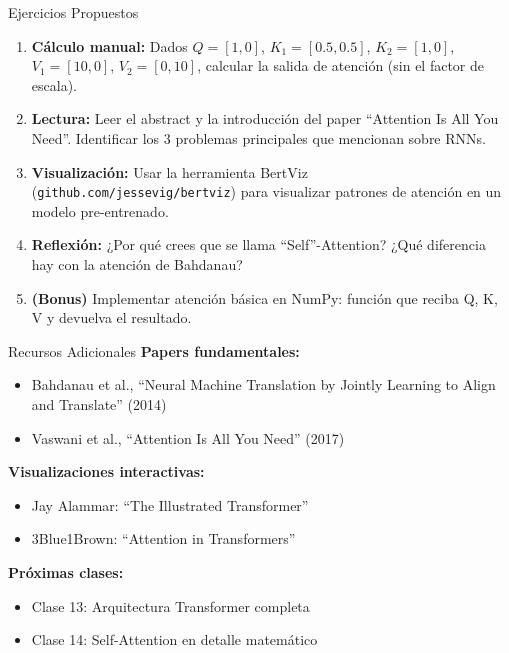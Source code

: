 \documentclass[aspectratio=169]{beamer}
\begin{document}
\begin{frame}{Ejercicios Propuestos}
    \begin{enumerate}
        \setlength\itemsep{0.6em}
        \item \textbf{Cálculo manual:} Dados $Q=[1,0]$, $K_1=[0.5, 0.5]$, $K_2=[1, 0]$, $V_1=[10, 0]$, $V_2=[0, 10]$, calcular la salida de atención (sin el factor de escala).
        
        \item \textbf{Lectura:} Leer el abstract y la introducción del paper ``Attention Is All You Need''. Identificar los 3 problemas principales que mencionan sobre RNNs.
        
        \item \textbf{Visualización:} Usar la herramienta BertViz (\texttt{github.com/jessevig/bertviz}) para visualizar patrones de atención en un modelo pre-entrenado.
        
        \item \textbf{Reflexión:} ¿Por qué crees que se llama ``Self''-Attention? ¿Qué diferencia hay con la atención de Bahdanau?
        
        \item \textbf{(Bonus)} Implementar atención básica en NumPy: función que reciba Q, K, V y devuelva el resultado.
    \end{enumerate}
\end{frame}

\begin{frame}{Recursos Adicionales}
    \textbf{Papers fundamentales:}
    \begin{itemize}
        \item Bahdanau et al., ``Neural Machine Translation by Jointly Learning to Align and Translate'' (2014)
        \item Vaswani et al., ``Attention Is All You Need'' (2017)
    \end{itemize}
    
    \vspace{0.3cm}
    \textbf{Visualizaciones interactivas:}
    \begin{itemize}
        \item Jay Alammar: ``The Illustrated Transformer''
        \item 3Blue1Brown: ``Attention in Transformers''
    \end{itemize}
    
    \vspace{0.3cm}
    \textbf{Próximas clases:}
    \begin{itemize}
        \item Clase 13: Arquitectura Transformer completa
        \item Clase 14: Self-Attention en detalle matemático
    \end{itemize}
\end{frame}
\end{document}
